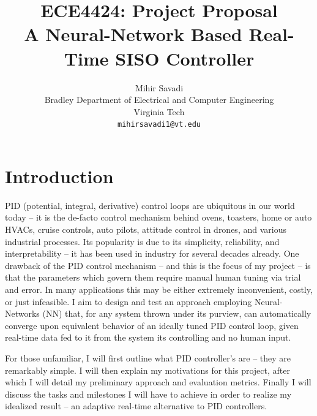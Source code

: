 \documentclass[10pt,twocolumn,letterpaper]{article}
\begin{document}
    \title{ECE4424: Project Proposal \\ A Neural-Network Based Real-Time SISO Controller}

    \author{Mihir Savadi\\
    Bradley Department of Electrical and Computer Engineering\\
    Virginia Tech\\
    {\tt\small mihirsavadi1@vt.edu} }

    \maketitle
    \thispagestyle{empty}


    \section{Introduction} \label{intro}

        PID (potential, integral, derivative) control loops are ubiquitous in our world today -- it is the de-facto
        control mechanism behind ovens, toasters, home or auto HVACs, cruise controls, auto pilots, attitude control in
        drones, and various industrial processes. Its popularity is due to its simplicity, reliability, and
        interpretability -- it has been used in industry for several decades already. One drawback of the PID control
        mechanism -- and this is the focus of my project -- is that the parameters which govern them require manual
        human tuning via trial and error. In many applications this may be either extremely inconvenient, costly, or
        just infeasible. I aim to design and test an approach employing Neural-Networks (NN) that, for any system thrown
        under its purview, can automatically converge upon equivalent behavior of an ideally tuned PID control loop,
        given real-time data fed to it from the system its controlling and no human input.

        For those unfamiliar, I will first outline what PID controller's are -- they are remarkably simple. I will then
        explain my motivations for this project, after which I will detail my preliminary approach and evaluation
        metrics. Finally I will discuss the tasks and milestones I will have to achieve in order to realize my idealized
        result -- an adaptive real-time alternative to PID controllers.
\end{document}
